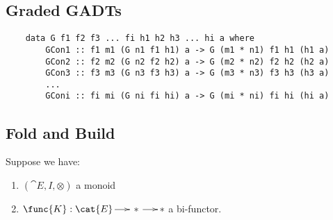 \subsection{Graded GADTs}
\label{subsec:graded_gadts}

\begin{verbatim}
    data G f1 f2 f3 ... fi h1 h2 h3 ... hi a where
        GCon1 :: f1 m1 (G n1 f1 h1) a -> G (m1 * n1) f1 h1 (h1 a)
        GCon2 :: f2 m2 (G n2 f2 h2) a -> G (m2 * n2) f2 h2 (h2 a)
        GCon3 :: f3 m3 (G n3 f3 h3) a -> G (m3 * n3) f3 h3 (h3 a)
        ...
        GConi :: fi mi (G ni fi hi) a -> G (mi * ni) fi hi (hi a)
\end{verbatim} 


\subsection{Fold and Build}
\label{subsec:fold_and_build}
Suppose we have:
\begin{center}
    \begin{enumerate}[label=\roman*.]
        \item $(\cat{E},I,\otimes)$ a monoid
        \item $\func{K} : \cat{E} \to * \to *$ a bi-functor.
    \end{enumerate}
\end{center}

\newcommand{\UConeM}[1]{\mathsf{U}_{\func{#1}}\text{-}\mathsf{Cone}}
\newcommand{\UConeHom}[1]{\mathsf{U}_{\func{#1}}\text{-}\mathsf{ConeHom}}
\newcommand{\GradeAlg}[1]{\func{#1}\text{-}\mathsf{GradeAlg}}
\newcommand{\GradeAlgHom}[1]{\func{#1}\text{-}\mathsf{GradeAlgHom}}
\newcommand{\build}[2]{\mathsf{build}^*_{\func{#1},\func{#2}}} 
\newcommand{\foldT}{\mathsf{fold}}
\newcommand{\fold}[2]{\foldT^*_{\func{#1},\func{#2}}}
\newcommand{\foldOne}[1]{\foldT^*_{\func{#1}}}

